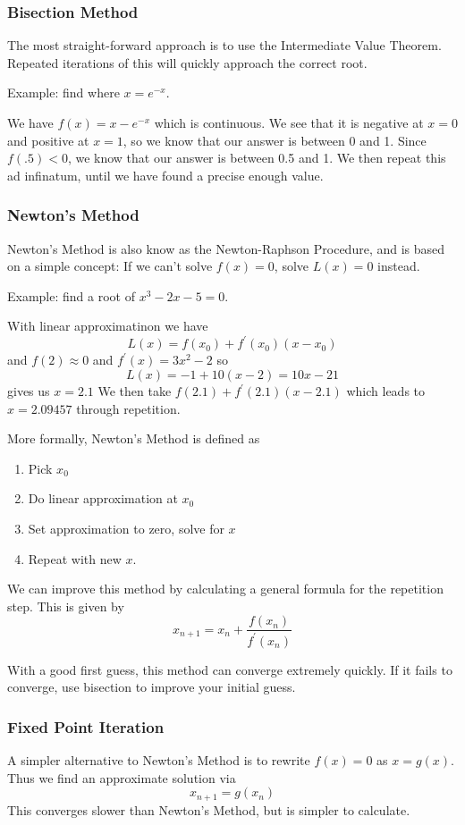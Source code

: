 \documentclass[12pt]{article}
\begin{document}
\subsubsection*{Bisection Method}
The most straight-forward approach is to use the Intermediate Value Theorem. Repeated iterations of this will quickly approach the correct root.

Example: find where $x = e^{-x}$.

We have $f(x) = x - e^{-x}$ which is continuous. We see that it is negative at $x = 0$ and positive at $x = 1$, so we know that our answer is between 0 and 1. Since $f(.5) < 0$, we know that our answer is between 0.5 and 1. We then repeat this ad infinatum, until we have found a precise enough value.

\subsubsection*{Newton's Method}
Newton's Method is also know as the Newton-Raphson Procedure, and is based on a simple concept: If we can't solve $f(x) = 0$, solve $L(x) = 0$ instead.

Example: find a root of $x^3 - 2x - 5 = 0$.

With linear approximatinon we have \[ L(x) = f(x_0) + f^\prime(x_0)(x-x_0) \] and $f(2) \approx 0$ and $f^\prime(x) = 3x^2 - 2$ so \[ L(x) = -1 + 10(x-2) = 10x - 21 \] gives us $x = 2.1$ We then take $f(2.1) + f^\prime(2.1)(x-2.1)$ which leads to $x = 2.09457$ through repetition.

More formally, Newton's Method is defined as
\begin{enumerate}
\item Pick $x_0$
\item Do linear approximation at $x_0$
\item Set approximation to zero, solve for $x$
\item Repeat with new $x$.
\end{enumerate}

We can improve this method by calculating a general formula for the repetition step. This is given by \[ x_{n+1} = x_n + \frac{f(x_n)}{f^\prime(x_n)} \]

With a good first guess, this method can converge extremely quickly. If it fails to converge, use bisection to improve your initial guess. 

\subsubsection*{Fixed Point Iteration}
A simpler alternative to Newton's Method is to rewrite $f(x) = 0$ as $x = g(x)$. Thus we find an approximate solution via \[ x_{n+1} = g(x_n) \] This converges slower than Newton's Method, but is simpler to calculate.
\end{document}
